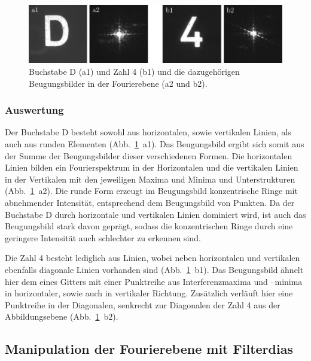 \begin{figure}[h]
	\centering
	\includegraphics{images/Regina/abb19.pdf}
	\caption[Ziffern mit Fourierspektren]{
		Buchstabe D (a1) und Zahl 4 (b1) und die dazugehörigen Beugungsbilder in der Fourierebene (a2 und b2).
	}
	\label{fig:ziffern_mit_spektren}
\end{figure}

\subsubsection*{Auswertung}

Der Buchstabe D besteht sowohl aus horizontalen, sowie vertikalen Linien, als auch aus runden Elementen (Abb.~\ref{fig:ziffern_mit_spektren}~a1). Das Beugungsbild ergibt sich somit aus der Summe der Beugungsbilder dieser verschiedenen Formen. Die horizontalen Linien bilden ein Fourierspektrum in der Horizontalen und die vertikalen Linien in der Vertikalen mit den jeweiligen Maxima und Minima und Unterstrukturen (Abb.~\ref{fig:ziffern_mit_spektren}~a2). Die runde Form erzeugt im Beugungsbild konzentrische Ringe mit abnehmender Intensität, entsprechend dem Beugungsbild von Punkten. Da der Buchstabe D durch horizontale und vertikalen Linien dominiert wird, ist auch das Beugungsbild stark davon geprägt, sodass die konzentrischen Ringe durch eine geringere Intensität auch schlechter zu erkennen sind.

Die Zahl 4 besteht lediglich aus Linien, wobei neben horizontalen und vertikalen ebenfalls diagonale Linien vorhanden sind (Abb.~\ref{fig:ziffern_mit_spektren}~b1). Das Beugungsbild ähnelt hier dem eines Gitters mit einer Punktreihe aus Interferenzmaxima und –minima in horizontaler, sowie auch in vertikaler Richtung. Zusätzlich verläuft hier eine Punktreihe in der Diagonalen, senkrecht zur Diagonalen der Zahl 4 aus der Abbildungsebene (Abb.~\ref{fig:ziffern_mit_spektren}~b2).


\subsection{Manipulation der Fourierebene mit Filterdias}

